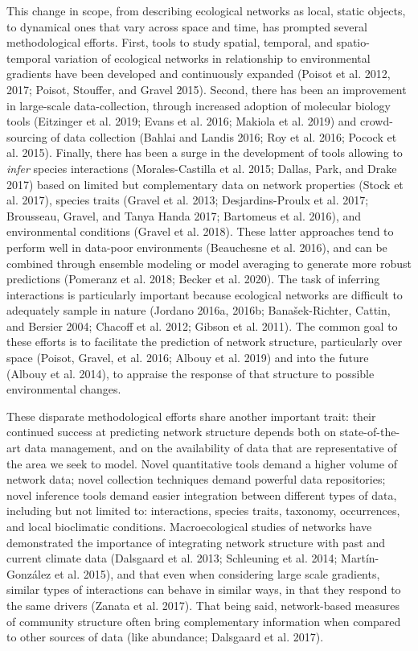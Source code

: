 \documentclass[11pt]{article}
\begin{document}
This change in scope, from describing ecological networks as local,
static objects, to dynamical ones that vary across space and time, has
prompted several methodological efforts. First, tools to study spatial,
temporal, and spatio-temporal variation of ecological networks in
relationship to environmental gradients have been developed and
continuously expanded (Poisot et al. 2012, 2017; Poisot, Stouffer, and
Gravel 2015). Second, there has been an improvement in large-scale
data-collection, through increased adoption of molecular biology tools
(Eitzinger et al. 2019; Evans et al. 2016; Makiola et al. 2019) and
crowd-sourcing of data collection (Bahlai and Landis 2016; Roy et al.
2016; Pocock et al. 2015). Finally, there has been a surge in the
development of tools allowing to \emph{infer} species interactions
(Morales-Castilla et al. 2015; Dallas, Park, and Drake 2017) based on
limited but complementary data on network properties (Stock et al.
2017), species traits (Gravel et al. 2013; Desjardins-Proulx et al.
2017; Brousseau, Gravel, and Tanya Handa 2017; Bartomeus et al. 2016),
and environmental conditions (Gravel et al. 2018). These latter
approaches tend to perform well in data-poor environments (Beauchesne et
al. 2016), and can be combined through ensemble modeling or model
averaging to generate more robust predictions (Pomeranz et al. 2018;
Becker et al. 2020). The task of inferring interactions is particularly
important because ecological networks are difficult to adequately sample
in nature (Jordano 2016a, 2016b; Banašek-Richter, Cattin, and Bersier
2004; Chacoff et al. 2012; Gibson et al. 2011). The common goal to these
efforts is to facilitate the prediction of network structure,
particularly over space (Poisot, Gravel, et al. 2016; Albouy et al.
2019) and into the future (Albouy et al. 2014), to appraise the response
of that structure to possible environmental changes.

These disparate methodological efforts share another important trait:
their continued success at predicting network structure depends both on
state-of-the-art data management, and on the availability of data that
are representative of the area we seek to model. Novel quantitative
tools demand a higher volume of network data; novel collection
techniques demand powerful data repositories; novel inference tools
demand easier integration between different types of data, including but
not limited to: interactions, species traits, taxonomy, occurrences, and
local bioclimatic conditions. Macroecological studies of networks have
demonstrated the importance of integrating network structure with past
and current climate data (Dalsgaard et al. 2013; Schleuning et al. 2014;
Martín-González et al. 2015), and that even when considering large scale
gradients, similar types of interactions can behave in similar ways, in
that they respond to the same drivers (Zanata et al. 2017). That being
said, network-based measures of community structure often bring
complementary information when compared to other sources of data (like
abundance; Dalsgaard et al. 2017).
\end{document}
